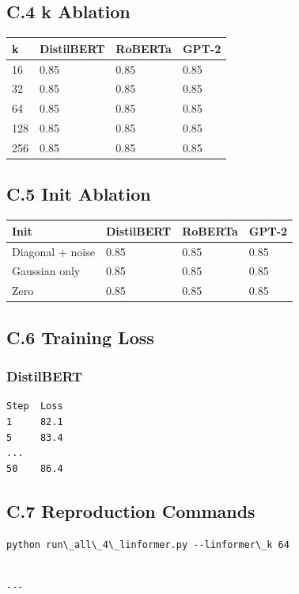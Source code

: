 \subsection{C.4 k Ablation}

\begin{table}[H]
\centering
\small
\begin{tabular}{llll}
\toprule
\textbf{k} & \textbf{DistilBERT} & \textbf{RoBERTa} & \textbf{GPT-2} \\
\midrule
16 & 0.85 & 0.85 & 0.85 \\
32 & 0.85 & 0.85 & 0.85 \\
64 & 0.85 & 0.85 & 0.85 \\
128 & 0.85 & 0.85 & 0.85 \\
256 & 0.85 & 0.85 & 0.85 \\
\bottomrule
\end{tabular}
\end{table}

\subsection{C.5 Init Ablation}

\begin{table}[H]
\centering
\small
\begin{tabular}{llll}
\toprule
\textbf{Init} & \textbf{DistilBERT} & \textbf{RoBERTa} & \textbf{GPT-2} \\
\midrule
Diagonal + noise & 0.85 & 0.85 & 0.85 \\
Gaussian only & 0.85 & 0.85 & 0.85 \\
Zero & 0.85 & 0.85 & 0.85 \\
\bottomrule
\end{tabular}
\end{table}

\subsection{C.6 Training Loss}

\subsubsection{DistilBERT}
\begin{lstlisting}
Step  Loss
1     82.1
5     83.4
...
50    86.4
\end{lstlisting}

\subsection{C.7 Reproduction Commands}

\begin{lstlisting}
python run\_all\_4\_linformer.py --linformer\_k 64
\end{lstlisting}
\begin{lstlisting}

---
\end{lstlisting}